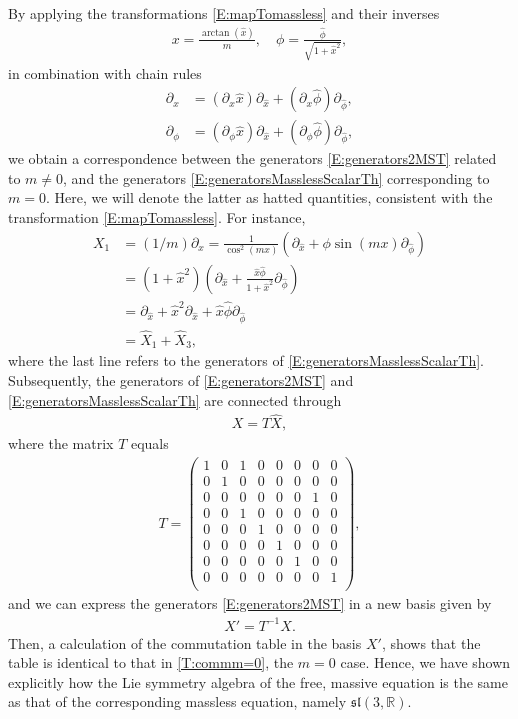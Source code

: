 \documentclass[a4paper,hidelinks, 12pt]{article}
\numberwithin{equation}{section}
\theoremstyle{plain}
\newcommand{\La}{\mathfrak}
\newcommand{\N}[1]{\mathbb{#1}}
\newcommand{\nn}{\nonumber}
\begin{document}
By applying the transformations \eqref{E:mapTomassless} and their
inverses
\begin{align}\label{E:mapTomasslessInv}
x=\frac{\arctan(\hat{x})}{m},	\quad \phi=\frac{\hat{\phi}}{\sqrt{1+\hat{x}^2}}, 
\end{align}
in combination with chain rules
\begin{align}
	\partial_x &=(\partial_x \hat{x})\partial_{\hat{x}}+(\partial_x\hat{\phi})\partial_{\hat{\phi}}, \nn \\
	\partial_\phi &=(\partial_\phi \hat{x})\partial_{\hat{x}}+(\partial_\phi \hat{\phi})\partial_{\hat{\phi}},
\end{align}
we obtain a correspondence between the generators \eqref{E:generators2MST} related to $m\ne 0$, and the generators \eqref{E:generatorsMasslessScalarTh} corresponding to $m= 0$. Here, we will denote the latter as hatted quantities, consistent with the transformation \eqref{E:mapTomassless}. For instance,
\begin{align}
	X_1 &=(1/m)\partial_x=\frac{1}{\cos^2(mx)}(\partial_{\hat{x}}+\phi\sin(mx)\partial_{\hat{\phi}}) \nn \\
	&=(1+\hat{x}^2)(\partial_{\hat{x}}+\frac{\hat{x}\hat{\phi}}{1+\hat{x}^2}\partial_{\hat{\phi}}) \nn \\
	&=\partial_{\hat{x}}+ \hat{x}^2\partial_{\hat{x}}+\hat{x}\hat{\phi}\partial_{\hat{\phi}}\nn \\
	&=\hat{X}_1 +\hat{X}_3,
\end{align}
where the last line refers to the generators of \eqref{E:generatorsMasslessScalarTh}.
Subsequently, the generators of \eqref{E:generators2MST} and \eqref{E:generatorsMasslessScalarTh}
are connected through 
\begin{align}
	X=T \hat{X},
\end{align}
where the matrix $T$ equals
\begin{align}
	T=\left(
\begin{array}{cccccccc}
 1 & 0 & 1 & 0 & 0 & 0 & 0 & 0 \\
 0 & 1 & 0 & 0 & 0 & 0 & 0 & 0 \\
 0 & 0 & 0 & 0 & 0 & 0 & 1 & 0 \\
 0 & 0 & 1 & 0 & 0 & 0 & 0 & 0 \\
 0 & 0 & 0 & 1 & 0 & 0 & 0 & 0 \\
 0 & 0 & 0 & 0 & 1 & 0 & 0 & 0 \\
 0 & 0 & 0 & 0 & 0 & 1 & 0 & 0 \\
 0 & 0 & 0 & 0 & 0 & 0 & 0 & 1 \\
\end{array}
\right),
\end{align}
and we can express the generators \eqref{E:generators2MST}
in a new basis given by
\begin{align}
	{X}'= T^{-1}X.
\end{align}
Then, a calculation of the commutation table in the basis ${X}'$, shows that the table is identical to that in \eqref{T:commm=0}, the $m=0$ case. Hence, we have shown explicitly how the Lie symmetry algebra of the free, massive equation
is the same as that of the corresponding massless equation, namely $\La{sl}(3,\N{R})$.
\end{document}
